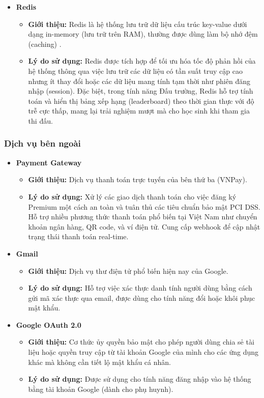 \begin{itemize}
	\item \textbf{Redis} 
	\begin{itemize}
		\item \textbf{Giới thiệu:} Redis là hệ thống lưu trữ dữ liệu cấu trúc key-value dưới dạng in-memory (lưu trữ trên RAM), thường được dùng làm bộ nhớ đệm (caching) \cite{redis}.
		\item \textbf{Lý do sử dụng:} Redis được tích hợp để tối ưu hóa tốc độ phản hồi của hệ thống thông qua việc lưu trữ các dữ liệu có tần suất truy cập cao nhưng ít thay đổi hoặc các dữ liệu mang tính tạm thời như phiên đăng nhập (session). Đặc biệt, trong tính năng Đấu trường, Redis hỗ trợ tính toán và hiển thị bảng xếp hạng (leaderboard) theo thời gian thực với độ trễ cực thấp, mang lại trải nghiệm mượt mà cho học sinh khi tham gia thi đấu.
	\end{itemize}
\end{itemize}

\newpage
\subsubsection{Dịch vụ bên ngoài}
\begin{itemize}
  \item \textbf{Payment Gateway}
    \begin{itemize}
      \item \textbf{Giới thiệu:} Dịch vụ thanh toán trực tuyến của bên thứ ba (VNPay).
      \item \textbf{Lý do sử dụng:} Xử lý các giao dịch thanh toán cho việc đăng ký Premium một cách an toàn và tuân thủ các tiêu chuẩn bảo mật PCI DSS. Hỗ trợ nhiều phương thức thanh toán phổ biến tại Việt Nam như chuyển khoản ngân hàng, QR code, và ví điện tử. Cung cấp webhook để cập nhật trạng thái thanh toán real-time.
    \end{itemize}
    \item \textbf{Gmail}
    \begin{itemize}
    	\item \textbf{Giới thiệu:} Dịch vụ thư điện tử phổ biến hiện nay của Google.
    	\item \textbf{Lý do sử dụng:} Hỗ trợ việc xác thực danh tính người dùng bằng cách gửi mã xác thực qua email, được dùng cho tính năng đổi hoặc khôi phục mật khẩu.
    \end{itemize}
    \item \textbf{Google OAuth 2.0}
    \begin{itemize}
    	\item \textbf{Giới thiệu:} Cơ thức ủy quyền bảo mật cho phép người dùng chia sẻ tài liệu hoặc quyền truy cập từ tài khoản Google của mình cho các ứng dụng khác mà không cần tiết lộ mật khẩu cá nhân.
    	\item \textbf{Lý do sử dụng:} Được sử dụng cho tính năng đăng nhập vào hệ thống bằng tài khoản Google (dành cho phụ huynh).
    \end{itemize}
 \end{itemize}
 
